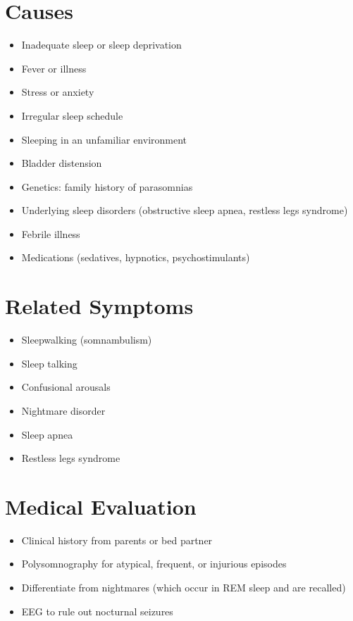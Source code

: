 \section*{Causes}
\begin{itemize}
\item Inadequate sleep or sleep deprivation
\item Fever or illness
\item Stress or anxiety
\item Irregular sleep schedule
\item Sleeping in an unfamiliar environment
\item Bladder distension
\item Genetics: family history of parasomnias
\item Underlying sleep disorders (obstructive sleep apnea, restless legs syndrome)
\item Febrile illness
\item Medications (sedatives, hypnotics, psychostimulants)
\end{itemize}

\section*{Related Symptoms}
\begin{itemize}
\item Sleepwalking (somnambulism)
\item Sleep talking
\item Confusional arousals
\item Nightmare disorder
\item Sleep apnea
\item Restless legs syndrome
\end{itemize}

\section*{Medical Evaluation}
\begin{itemize}
\item Clinical history from parents or bed partner
\item Polysomnography for atypical, frequent, or injurious episodes
\item Differentiate from nightmares (which occur in REM sleep and are recalled)
\item EEG to rule out nocturnal seizures
\end{itemize}

